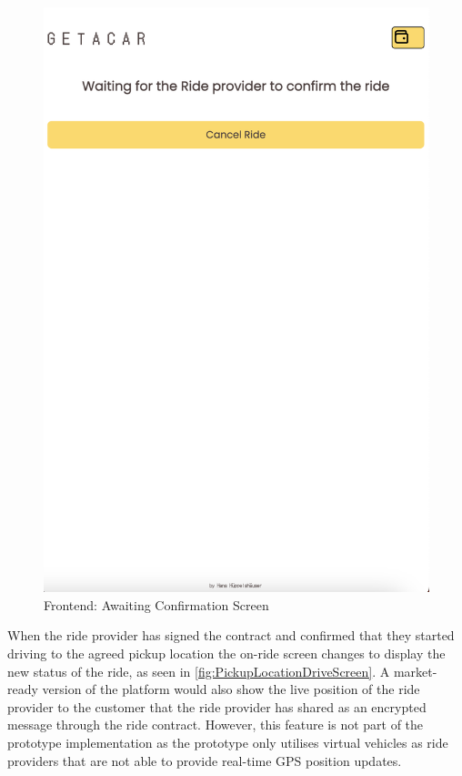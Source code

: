 \begin{figure}[H]
\begin{minipage}{0.45\linewidth}
        \label{fig:RideOverviewScreen}
    \end{minipage}
    \hfill
    \begin{minipage}{0.45\linewidth}
        \centering
        \includegraphics[width=\linewidth]{data/ffss/6.png}
        \caption{Frontend: Awaiting Confirmation Screen}
        \label{fig:AwaitingConfirmationScreen}
    \end{minipage}
    
\end{figure}

When the ride provider has signed the contract and confirmed that they started driving to the agreed pickup location the on-ride screen changes to display the new status of the ride, as seen in \ref{fig:PickupLocationDriveScreen}. A market-ready version of the platform would also show the live position of the ride provider to the customer that the ride provider has shared as an encrypted message through the ride contract. However, this feature is not part of the prototype implementation as the prototype only utilises virtual vehicles as ride providers that are not able to provide real-time GPS position updates.

